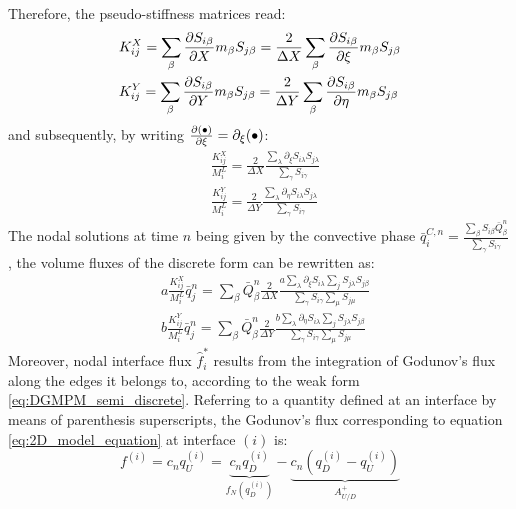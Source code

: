 Therefore, the pseudo-stiffness matrices read:
\begin{equation}
  \begin{aligned}
    & K_{ij}^X = \sum_\beta \frac{\partial S_{i\beta}}{\partial X}m_\beta S_{j\beta}=\frac{2}{\Delta X}\sum_\beta\frac{\partial S_{i\beta}}{\partial \xi}m_\beta S_{j\beta} \\
    &K_{ij}^Y = \sum_\beta\frac{\partial S_{i\beta}}{\partial Y}m_\beta S_{j\beta}=\frac{2}{\Delta Y}\sum_\beta\frac{\partial S_{i\beta}}{\partial \eta}m_\beta S_{j\beta} \\
  \end{aligned}
\end{equation}
and subsequently, by writing $\frac{\partial (\bullet)}{\partial \xi}=\partial_\xi(\bullet)$:
\begin{equation}
  \label{eq:2Dpseudo_stiffness}
  \begin{aligned}
    & \frac{K_{ij}^X}{M_i^L}  =  \frac{2}{\Delta X} \frac{\sum_\lambda\partial_\xi S_{i\lambda}  S_{j\lambda}}{\sum_\gamma  S_{i\gamma}} \\
    & \frac{K_{ij}^Y}{M_i^L} = \frac{2}{\Delta Y} \frac{\sum_\lambda\partial_\eta S_{i\lambda} S_{j\lambda}}{\sum_\gamma S_{i\gamma}}
  \end{aligned}
\end{equation}
The nodal solutions at time $n$ being given by the convective phase $\bar{q}^{C,n}_i=\frac{\sum_\beta S_{i\beta}\bar{Q}^n_\beta}{\sum_\gamma S_{i\gamma}}$, the volume fluxes of the discrete form can be rewritten as:
\begin{equation}
  \label{eq:2Dvolume_fluxes}
  \begin{aligned}
    & a\frac{K_{ij}^X}{M_i^L}\bar{q}^n_j  = \sum_\beta \bar{Q}^n_\beta \frac{2}{\Delta X} \frac{a\sum_\lambda\partial_\xi S_{i\lambda}  \sum_j S_{j\lambda} S_{j\beta}}{\sum_\gamma  S_{i\gamma}\sum_\mu S_{j\mu}}\\
    & b\frac{K_{ij}^Y}{M_i^L}\bar{q}^n_j = \sum_\beta \bar{Q}^n_\beta\frac{2}{\Delta Y}  \frac{b \sum_\lambda\partial_\eta S_{i\lambda}  \sum_j S_{j\lambda} S_{j\beta}}{\sum_\gamma  S_{i\gamma}\sum_\mu S_{j\mu}}
  \end{aligned}
\end{equation}
Moreover, nodal interface flux $\hat{f}_i^{*}$ results from the integration of Godunov's flux along the edges it belongs to, according to the weak form \eqref{eq:DGMPM_semi_discrete}.
Referring to a quantity defined at an interface by means of parenthesis superscripts, the Godunov's flux corresponding to equation \eqref{eq:2D_model_equation} at interface $(i)$ is:
\begin{equation}
  \label{eq:2d_Godunov_fluxes}
  f^{(i)}= c_n q^{(i)}_U = \underbrace{c_nq^{(i)}_D}_{f_N(q^{(i)}_D)} - \underbrace{c_n (q^{(i)}_D -q^{(i)}_U)}_{A^{+}_{U/D}} 
\end{equation}
